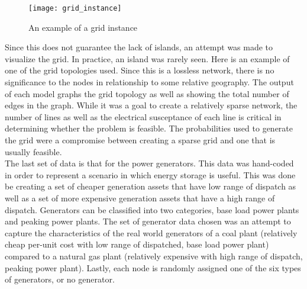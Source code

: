 \begin{figure}[h]
\centering
\texttt{[image: grid\_instance]}
\caption{An example of a grid instance}
\label{fig:grid_instance}
\end{figure}

Since this does not guarantee the lack of islands, an attempt was made to
visualize the grid. In practice, an island was rarely seen. Here is an example of one
of the grid topologies used. Since this is a lossless network, there is no significance
to the nodes in relationship to some relative geography. The output of each model
graphs the grid topology as well as showing the total number of edges in the graph.
While it was a goal to create a relatively sparse network, the number of lines as
well as the electrical susceptance of each line is critical in determining whether the
problem is feasible. The probabilities used to generate the grid were a
compromise between creating a sparse grid and one that is usually feasible.  \\

The last set of data is that for the power generators. This data was hand-coded in order to
represent a scenario in which energy storage is useful. This was done be creating a set of cheaper
generation assets that have low range of dispatch as well as a set of more expensive generation assets
that have a high range of dispatch. Generators can be classified into two categories, base load power
plants and peaking power plants. The set of generator data chosen was an attempt to capture the
characteristics of the real world generators of a coal plant (relatively cheap per-unit cost with low range
of dispatched, base load power plant) compared to a natural gas plant (relatively expensive with high
range of dispatch, peaking power plant). Lastly, each node is randomly assigned one of the six types of
generators, or no generator. 

